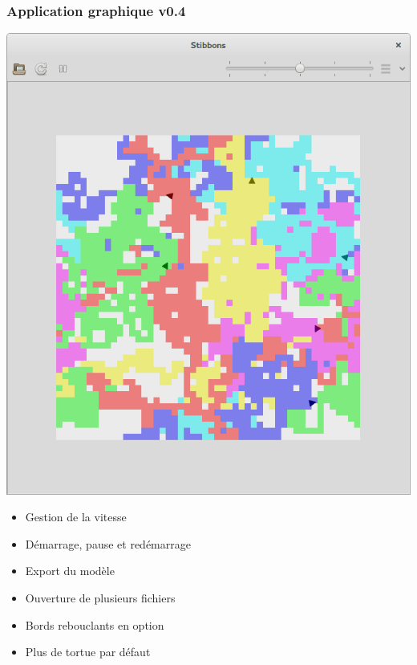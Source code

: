 \begin{frame}
\frametitle{Application graphique v0.4}
\begin{center}
\includegraphics[scale=0.16]{doc/Presentation/screenshot/stibbons-0-4-2.png}
\end{center}

\begin{itemize}
	\item Gestion de la vitesse
	\item Démarrage, pause et redémarrage
	\item Export du modèle
	\item Ouverture de plusieurs fichiers
	\item Bords rebouclants en option
	\item Plus de tortue par défaut
\end{itemize}
\end{frame}

